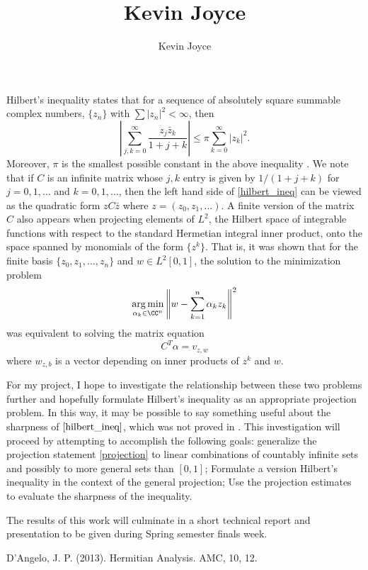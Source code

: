\documentclass{homework} %
\title{Kevin Joyce}
\author{Kevin Joyce}
\DeclareMathOperator*{\argmin}{arg\,min}
\begin{document}
 
\newcommand{\eps}{\varepsilon}
\newcommand{\del}{\partial}

Hilbert's inequality states that for a sequence of absolutely square summable complex numbers, $\{z_n\}$ with $\sum |z_n|^2 < \infty$, then
\begin{equation}
  \left| \sum_{j,k=0}^\infty \frac{z_j\bar z_k}{1 + j + k}\right| \le \pi \sum_{k=0}^\infty |z_k|^2. \label{hilbert_ineq}
\end{equation}
Moreover, $\pi$ is the smallest possible constant in the above inequality \cite{dangelo}.  We note that if $C$ is an infinite matrix whose $j,k$ entry is given by $1/(1+j+k)$ for $j=0,1,\dots$ and $k=0,1,\dots$, then the left hand side of \eqref{hilbert_ineq} can be viewed as the quadratic form $z C \bar z$ where $z = (z_0,z_1,\dots)$.  A finite version of the matrix $C$ also appears when projecting elements of $L^2$, the Hilbert space of integrable functions with respect to the standard Hermetian integral inner product, onto the space spanned by monomials of the form $\{z^k\}$.  That is, it was shown that for the finite basis $\{z_0,z_1,\dots,z_n\}$ and $w \in L^2[0,1]$, the solution to the minimization problem
\begin{equation}
  \argmin_{\alpha_k\in \CC^n} \left\|w - \sum_{k=1}^n \alpha_k z_k\right\|^2 \label{projection}
\end{equation}
was equivalent to solving the matrix equation
\begin{equation}
  C^T \alpha = v_{z,w}
\end{equation}
where $w_{z,b}$ is a vector depending on inner products of $z^k$ and $w$.  

For my project, I hope to investigate the relationship between these two
problems further and hopefully formulate Hilbert's inequality as an appropriate
projection problem.  In this way, it may be possible to say something useful
about the sharpness of $\eqref{hilbert_ineq}$, which was not proved in
\cite{dangelo}. This investigation will proceed by attempting to accomplish the following goals: generalize the projection
statement \eqref{projection} to linear combinations of countably infinite sets and possibly to more general sets than $[0,1]$; Formulate
a version Hilbert's inequality in the context of the general projection; Use the projection estimates
to evaluate the sharpness of the inequality.

The results of this work will culminate in a short technical report and presentation to be given during Spring semester finals week.

\begin{thebibliography}{1}
     D'Angelo, J. P. (2013). Hermitian Analysis. AMC, 10, 12.
    \end{thebibliography}
\end{document}
